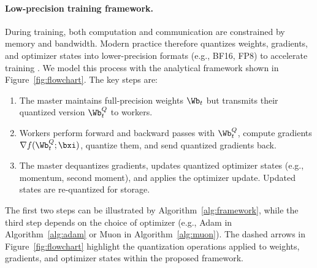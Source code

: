 \documentclass[11pt, letterpaper]{article}
\begin{document}
\paragraph{Low-precision training framework.}
During training, both computation and communication are constrained by memory and bandwidth. 
Modern practice therefore quantizes weights, gradients, and optimizer states into lower-precision formats (e.g., BF16, FP8) to accelerate training \citep{peng2023fp8, liu2024deepseek, fishman2025scaling}. 
We model this process with the analytical framework shown in Figure~\ref{fig:flowchart}. 
The key steps are:
\begin{enumerate}[leftmargin=*]
    \item The master maintains full-precision weights $\Wb_t$ but transmits their quantized version $\Wb_t^Q$ to workers.
    \item Workers perform forward and backward passes with $\Wb_t^Q$, compute gradients $\nabla f(\Wb_t^Q; \bxi)$, quantize them, and send quantized gradients back.
    \item The master dequantizes gradients, updates quantized optimizer states (e.g., momentum, second moment), and applies the optimizer update. Updated states are re-quantized for storage.
\end{enumerate}
The first two steps can be illustrated by Algorithm~\ref{alg:framework}, while the third step depends on the choice of optimizer (e.g., Adam in Algorithm~\ref{alg:adam} or Muon in Algorithm~\ref{alg:muon}). The dashed arrows in Figure~\ref{fig:flowchart} highlight the quantization operations applied to weights, gradients, and optimizer states within the proposed framework.
\end{document}
